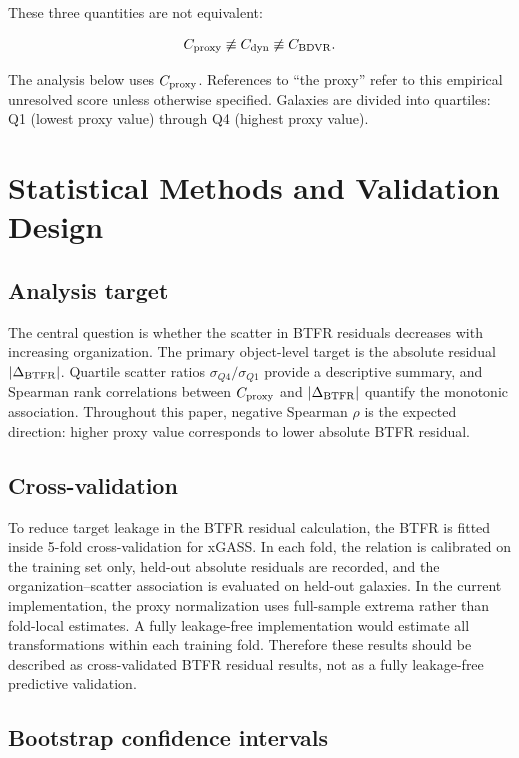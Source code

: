 \documentclass[11pt]{article}
\begin{document}
These three quantities are not equivalent:

\begin{equation}
C_{\rm proxy} \not\equiv C_{\rm dyn} \not\equiv C_{\rm BDVR}.
\label{eq:neq_coherence}
\end{equation}

The analysis below uses $C_{\rm proxy}$. References to ``the proxy'' refer to this empirical unresolved score unless otherwise specified. Galaxies are divided into quartiles: Q1 (lowest proxy value) through Q4 (highest proxy value).


\section{Statistical Methods and Validation Design}

\subsection{Analysis target}

The central question is whether the scatter in BTFR residuals decreases with increasing organization. The primary object-level target is the absolute residual $|\Delta_{\rm BTFR}|$. Quartile scatter ratios $\sigma_{Q4}/\sigma_{Q1}$ provide a descriptive summary, and Spearman rank correlations between $C_{\rm proxy}$ and $|\Delta_{\rm BTFR}|$ quantify the monotonic association. Throughout this paper, negative Spearman $\rho$ is the expected direction: higher proxy value corresponds to lower absolute BTFR residual.

\subsection{Cross-validation}

To reduce target leakage in the BTFR residual calculation, the BTFR is fitted inside 5-fold cross-validation for xGASS. In each fold, the relation is calibrated on the training set only, held-out absolute residuals are recorded, and the organization--scatter association is evaluated on held-out galaxies. In the current implementation, the proxy normalization uses full-sample extrema rather than fold-local estimates. A fully leakage-free implementation would estimate all transformations within each training fold. Therefore these results should be described as cross-validated BTFR residual results, not as a fully leakage-free predictive validation.

\subsection{Bootstrap confidence intervals}
\end{document}
